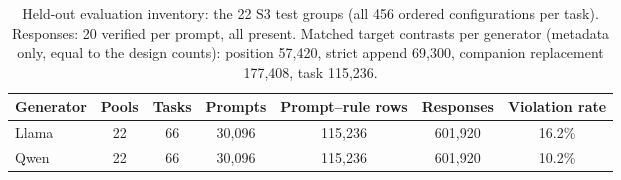 \begin{table}[t]
\centering\footnotesize
\caption{Held-out evaluation inventory: the 22 S3 test groups (all 456 ordered configurations per task). Responses: 20 verified per prompt, all present. Matched target contrasts per generator (metadata only, equal to the design counts): position 57,420, strict append 69,300, companion replacement 177,408, task 115,236.}
\label{tab:inventory}
\begin{tabular}{lcccccc}
\toprule
Generator & Pools & Tasks & Prompts & Prompt--rule rows & Responses & Violation rate \\
\midrule
Llama & 22 & 66 & 30,096 & 115,236 & 601,920 & 16.2\% \\
Qwen & 22 & 66 & 30,096 & 115,236 & 601,920 & 10.2\% \\
\bottomrule
\end{tabular}
\end{table}


